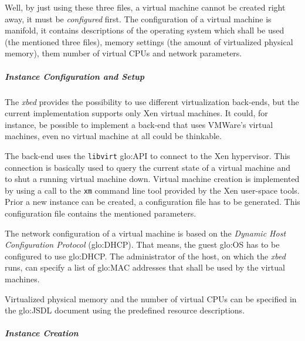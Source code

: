 Well, by just using these three files, a virtual machine cannot be created
right away,  it must be  \emph{configured} first.  The configuration  of a
virtual  machine is manifold,  it contains  descriptions of  the operating
system  which  shall be  used  (\ie the  mentioned  three files),  memory
settings (\ie the amount of  virtualized physical memory), them number of
virtual CPUs and network parameters.

\subparagraph{Instance Configuration and Setup}

The \emph{xbed}  provides the possibility to  use different virtualization
back-ends,  but  the  current  implementation supports  only  Xen  virtual
machines. It could, for instance, be possible to implement a back-end that
uses VMWare's  \cite{vmware} virtual machines, even no  virtual machine at
all could be thinkable.

The back-end uses  the \texttt{libvirt} \gls{glo:API} to connect
to  the Xen hypervisor.  This connection  is basically  used to  query the
current state of  a virtual machine and to shut  a running virtual machine
down.   Virtual machine creation  is implemented  by using  a call  to the
\texttt{xm} command line tool provided by the Xen user-space tools.  Prior
a  new  instance   can  be  created,  a  configuration   file  has  to  be
generated. This configuration file contains the mentioned parameters.

The  network  configuration   of  a  virtual  machine  is   based  on  the
\emph{Dynamic Host Configuration  Protocol} (\gls{glo:DHCP}).  That means,
the guest  \gls{glo:OS} has  to be configured  to use  \gls{glo:DHCP}. The
administrator of  the host, on which  the \emph{xbed} runs,  can specify a
list  of  \gls{glo:MAC}  addresses  that  shall be  used  by  the  virtual
machines.

Virtualized  physical  memory  and  the  number of  virtual  CPUs  can  be
specified  in the  \gls{glo:JSDL} document  using the  predefined resource
descriptions.

\subparagraph{Instance Creation}


